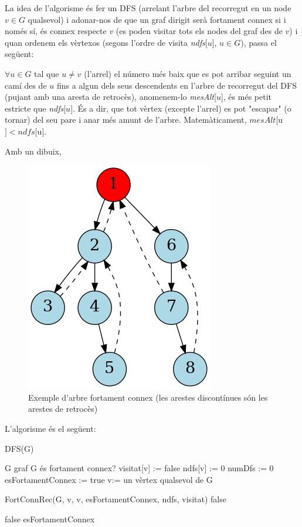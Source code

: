 \documentclass[a4paper,12pt]{article}
\begin{document}
La idea de l'algorisme és fer un DFS (arrelant l'arbre del recorregut en un node $v\in G$ qualsevol) i adonar-nos de que un graf dirigit serà fortament connex si i només sí, és connex respecte $v$ (es poden visitar tots els nodes del graf des de $v$) i quan ordenem els vèrtexos (segons l'ordre de visita \textit{ndfs}[$u$], $u \in G$), passa el següent:

$ \forall u \in G$ tal que $u \neq v$ (l'arrel) el número més baix que es pot arribar seguint un camí des de $u$ fins a algun dels seus descendents en l'arbre de recorregut del DFS (pujant amb una aresta de retrocès), anomenem-lo \textit{mesAlt}[$u$], és més petit estricte que \textit{ndfs}[$u$]. És a dir, que tot vèrtex (excepte l'arrel) es pot "escapar" (o tornar) del seu pare i anar més amunt de l'arbre. Matemàticament, $\textit{mesAlt}[$u$] < \textit{ndfs}[$u$]$.

Amb un dibuix,
\begin{figure}[H]
    \centering
    \includegraphics[width=0.3\linewidth]{graph.png}
    \caption{Exemple d'arbre fortament connex (les arestes discontínues són les arestes de retrocès)}
    \label{fig:G}
\end{figure}

L'algorisme és el següent:

\begin{algorithm}[H]
    \caption{DFS(G)}
    \begin{algorithmic}[1]  %
        \Require G graf
        \Ensure G és fortament connex?
            \State visitat[v] := false
            \State ndfs[v] := 0
        \EndFor
        \State
        \State numDfs := 0
        \State esFortamentConnex := true
        \State
        \State v:= un vèrtex qualsevol de G

        \State FortConnRec(G, v, v, esFortamentConnex, ndfs, visitat)
        \State
           \State \Return false
        \EndIf
        \State
        
                \State \Return false
            \EndIf
        \EndFor
        \State
        \State \Return esFortamentConnex
    \end{algorithmic}
\end{algorithm}
\end{document}
